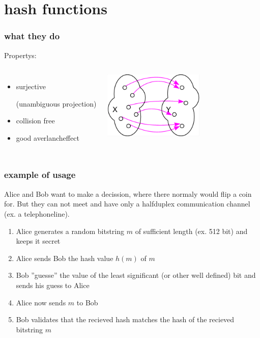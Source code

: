 \section{hash functions}

\begin{frame}
	\frametitle{what they do}
	Propertys:
	\begin{columns}
	\column{6cm}
		\begin{itemize}
			\item surjective \begin{small}(unambiguous projection)\end{small}
			\item collision free
			\item good averlancheffect
		\end{itemize}
	\column{6cm}
		\begin{center}
			\includegraphics[width=4.8cm,height=3.2cm]{surjektiv}
		\end{center}
	\end{columns}
\end{frame}

\begin{frame}
	\frametitle{example of usage}
	Alice and Bob want to make a decission, where there normaly would flip a coin for.
	But they can not meet and have only a halfduplex communication channel (ex. a telephoneline).
	\begin{enumerate}
		\item Alice generates a random bitstring $m$ of sufficient length (ex. 512 bit) and keeps it secret
		\item Alice sends Bob the hash value $h(m)$ of $m$
		\item Bob ''guesse'' the value of the least significant (or other well defined) bit and sends his guess to Alice
		\item Alice now sends $m$ to Bob
		\item Bob validates that the recieved hash matches the hash of the recieved bitstring $m$
	\end{enumerate}	
\end{frame}

